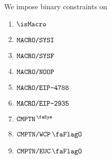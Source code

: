 We impose binary constraints on
\begin{multicols}{3}
	\begin{enumerate}
		\item $\isMacro$
		\item $\texttt{MACRO}\texttt{/}{\texttt{\texttt{SYSI}}}$
		\item $\texttt{MACRO}\texttt{/}{\texttt{\texttt{SYSF}}}$
		\item $\texttt{MACRO}\texttt{/}{\texttt{\texttt{NOOP}}}$
		\item $\texttt{MACRO}\texttt{/}{\texttt{\texttt{EIP-4788}}}$
		\item $\texttt{MACRO}\texttt{/}{\texttt{\texttt{EIP-2935}}}$
		\item $\isComputation$
		\item $\computationWcpFlag$
		\item $\computationEucFlag$
	\end{enumerate}
\end{multicols}
